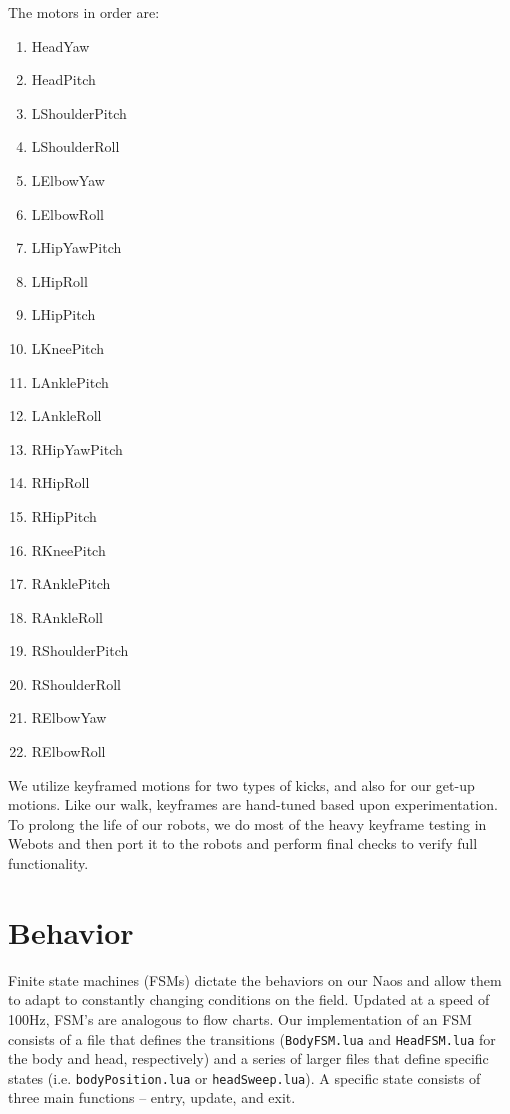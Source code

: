 \documentclass{article}
\begin{document}
  	The motors in order are:
	  \begin{multicols}{3}
		  \begin{enumerate}
			  \item HeadYaw
  			\item HeadPitch
	  		\item LShoulderPitch
		  	\item LShoulderRoll
			  \item LElbowYaw
  			\item LElbowRoll
	  		\item LHipYawPitch
		  	\item LHipRoll
			  \item LHipPitch
  			\item LKneePitch
	  		\item LAnklePitch
		  	\item LAnkleRoll
			  \item RHipYawPitch
  			\item RHipRoll
	  		\item RHipPitch
		  	\item RKneePitch
			  \item RAnklePitch
  			\item RAnkleRoll
	  		\item RShoulderPitch
		  	\item RShoulderRoll
			  \item RElbowYaw
  			\item RElbowRoll
	  	\end{enumerate}
  	\end{multicols}

	  We utilize keyframed motions for two types of kicks, and also for our get-up motions. Like our walk, keyframes are hand-tuned based upon experimentation. To prolong the life of our robots, we do most of the heavy keyframe testing in Webots and then port it to the robots and perform final checks to verify full functionality.



\section{Behavior}
	Finite state machines (FSMs) dictate the behaviors on our Naos and allow them to adapt to constantly changing conditions on the field. Updated at a speed of 100Hz, FSM's are analogous to flow charts. Our implementation of an FSM consists of a file that defines the transitions (\texttt{BodyFSM.lua} and \texttt{HeadFSM.lua} for the body and head, respectively) and a series of larger files that define specific states (i.e. \texttt{bodyPosition.lua} or \texttt{headSweep.lua}). A specific state consists of three main functions – entry, update, and exit. 
\end{document}
